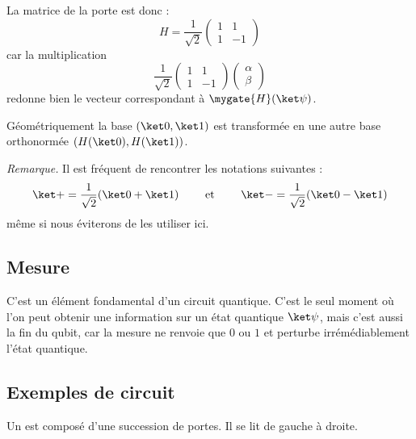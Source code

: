\documentclass[11pt,class=report,crop=false]{standalone}
\begin{document}
La matrice de la porte  est donc :
$$H = \frac1{\sqrt2}\begin{pmatrix}1&1\\1&-1\end{pmatrix}$$
  car la multiplication
  $$\frac1{\sqrt2}\begin{pmatrix}1&1\\1&-1\end{pmatrix}
\begin{pmatrix}\alpha\\\beta\end{pmatrix}$$
redonne bien le vecteur correspondant à $\mygate{H}(\ket\psi)$.

Géométriquement la base $(\ket0,\ket1)$ est transformée en une autre base orthonormée $(H(\ket0),H(\ket1))$.



\emph{Remarque.} Il est fréquent de rencontrer les notations suivantes :
$$\ket+ = \frac1{\sqrt2} (\ket0+\ket1) \qquad \text{ et  } \qquad \ket- = \frac1{\sqrt2} (\ket0-\ket1)$$ 
même si nous éviterons de les utiliser ici.

\subsection{Mesure}

C'est un élément fondamental d'un circuit quantique. C'est le seul moment où l'on peut obtenir une information sur un état quantique $\ket\psi$, mais c'est aussi la fin du qubit, car la mesure ne renvoie que $0$ ou $1$ et perturbe irrémédiablement l'état quantique.




\subsection{Exemples de circuit}

Un  est composé d'une succession de portes. Il se lit de gauche à droite.
\end{document}
